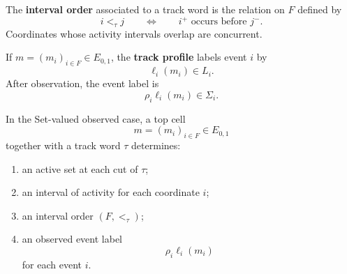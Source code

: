 \begin{definition}
\label{def:cmett-interval-order-track}
    The \textbf{interval order} associated to a track word is the relation on
    \(F\) defined by
    \[
        i<_{\tau}j
        \qquad\Longleftrightarrow\qquad
        i^+\text{ occurs before }j^-.
    \]
    Coordinates whose activity intervals overlap are concurrent.
\end{definition}

\begin{definition}
\label{def:cmett-track-profile}
    If \(m=(m_i)_{i\in F}\in E_{0,1}\), the \textbf{track profile} labels
    event \(i\) by
    \[
        \ell_i(m_i)\in L_i.
    \]
    After observation, the event label is
    \[
        \rho_i\ell_i(m_i)\in\Sigma_i.
    \]
\end{definition}

\begin{theorem}
\label{thm:cmett-tracks-produce-labelled-interval-orders}
    In the Set-valued observed case, a top cell
    \[
        m=(m_i)_{i\in F}\in E_{0,1}
    \]
    together with a track word \(\tau\) determines:
    \begin{enumerate}
        \item an active set at each cut of \(\tau\);
        \item an interval of activity for each coordinate \(i\);
        \item an interval order \((F,<_{\tau})\);
        \item an observed event label
        \[
            \rho_i\ell_i(m_i)
        \]
        for each event \(i\).
    \end{enumerate}
\end{theorem}

